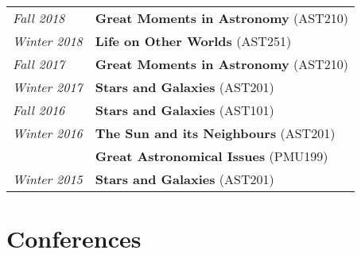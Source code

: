 \documentclass[10pt]{res} %
\begin{document}
\begin{resume}
\begin{table}[h]
\begin{tabularx}{\textwidth}{lX}
\textit{Fall 2018}      & \textbf{Great Moments in Astronomy} (AST210) \\
\textit{Winter 2018} & \textbf{Life on Other Worlds} (AST251) \\
\textit{Fall 2017}      & \textbf{Great Moments in Astronomy} (AST210) \\
\textit{Winter 2017} & \textbf{Stars and Galaxies} (AST201) \\
\textit{Fall 2016} & \textbf{Stars and Galaxies} (AST101) \\
\textit{Winter 2016}  & \textbf{The Sun and its Neighbours} (AST201) \\
                                & \textbf{Great Astronomical Issues} (PMU199) \\
\textit{Winter 2015} & \textbf{Stars and Galaxies} (AST201)
\end{tabularx}
\end{table}


\section{\Large Conferences}
\vspace{-5pt} %
\noindent\makebox[\linewidth]{\rule{\textwidth}{0.4pt}}
\vspace{-20pt} %


\end{resume}
\end{document}

